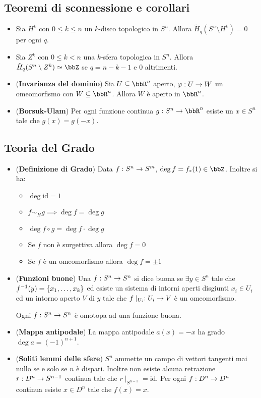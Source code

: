 \documentclass[a4paper,NoNotes,GeneralMath]{stdmdoc}
\newcommand{\id}{\text{id}}
\begin{document}
\subsection*{Teoremi di sconnessione e corollari}
\begin{itemize}
\item Sia $H^k$ con $0 \le k \le n$ un $k$-disco topologico in $S^n$.
  Allora $\tilde H_q(S^n \setminus H^k) = 0$ per ogni $q$.
\item Sia $Z^k$ con $0 \le k < n$ una $k$-sfera topologica in $S^n$.
  Allora $\tilde H_q(S^n \setminus Z^k) \simeq \bbZ$ se $q = n - k - 1$ e $0$ altrimenti.
\item ({\bf Invarianza del dominio}) Sia $U \subseteq \bbR^n$ aperto, $\varphi: U \rightarrow W$ un omeomorfismo con $W \subseteq \bbR^n$. Allora $W$ è aperto in $\bbR^n$.
\item ({\bf Borsuk-Ulam}) Per ogni funzione continua $g: S^n \rar \bbR^n$ esiste un $x \in S^n$ tale che $g(x) = g(-x)$.
\end{itemize}

\subsection*{Teoria del Grado}
\begin{itemize}
\item ({\bf Definizione di Grado}) Data $f: S^n \rightarrow S^m$, $\deg f = f_*(1) \in \bbZ$.
  Inoltre si ha:
  \begin{itemize}
  \item $\deg \id = 1$
  \item $f \sim_H g \implies \deg f = \deg g$
  \item $\deg f \circ g = \deg f \cdot \deg g$
  \item Se $f$ non è surgettiva allora $\deg f = 0$
  \item Se $f$ è un omeomorfismo allora $\deg f = \pm 1$
  \end{itemize}
\item ({\bf Funzioni buone}) Una $f: S^n \rightarrow S^n$ si dice buona se $\exists y \in S^n$ tale che $f^{-1}(y) = \left\{{x_1, \ldots, x_k}\right\}$ ed esiste un sistema di intorni aperti disgiunti $x_i \in U_i$ ed un intorno aperto $V$ di $y$ tale che $f\mid_{U_i}: U_i \rightarrow V$ è un omeomorfismo.

  Ogni $f: S^n \rightarrow S^n$ è omotopa ad una funzione buona.
\item ({\bf Mappa antipodale}) La mappa antipodale $a(x) = -x$ ha grado $\deg a = (-1)^{n+1}$.
\item ({\bf Soliti lemmi delle sfere}) $S^n$ ammette un campo di vettori tangenti mai nullo se e solo se $n$ è dispari.
  Inoltre non esiste alcuna retrazione $r: D^n \rightarrow S^{n-1}$ continua tale che $r\mid_{S^{n-1}} = \id$.
  Per ogni $f: D^n \rightarrow D^n$ continua esiste $x \in D^n$ tale che $f(x) = x$.
\end{itemize}
\end{document}
